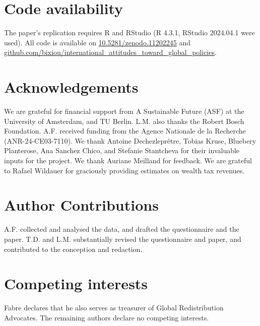 \documentclass[12pt,english]{article}
\begin{document}
\begin{small}
\section*{\normalsize Code availability}

The paper's replication requires R and RStudio (R 4.3.1, RStudio 2024.04.1 were used). All code is available on \href{https://zenodo.org/doi/10.5281/zenodo.11202245}{10.5281/zenodo.11202245} and \href{https://github.com/bixiou/international_attitudes_toward_global_policies}{github.com/bixiou/international\_attitudes\_toward\_global\_policies}. %

\section*{\normalsize Acknowledgements}

We are grateful for financial support from A Sustainable Future (ASF) at the University of Amsterdam, and TU Berlin. L.M. also thanks the Robert Bosch Foundation. A.F. received funding from the Agence Nationale de la Recherche (ANR-24-CE03-7110). %
We thank Antoine Dechezleprêtre, Tobias Kruse, Bluebery Planterose, Ana Sanchez Chico, and Stefanie Stantcheva for their invaluable inputs for the project. We thank Auriane Meilland for feedback. We are grateful to Rafael Wildauer for graciously providing estimates on wealth tax revenues. %

\section*{\normalsize Author Contributions} A.F. collected and analysed the data, and drafted the questionnaire and the paper. T.D. and L.M. substantially revised the questionnaire and paper, and contributed to the conception and redaction.

\section*{\normalsize Competing interests} Fabre declares that he also serves as treasurer of Global Redistribution Advocates. The remaining authors declare no competing interests. %
\end{small}  %

\begin{table}[h]
  \caption[List experiment: tacit support for the GCS]{Number of supported policies in the list experiment depending on the presence of the Global Climate Scheme (GCS) in the list. %
   The tacit support for the GCS is estimated by regressing the number of supported policies on the presence of the GCS in the list of policies. The social desirability is estimated as the difference-in-means between the tacit and stated support (see ), and it is not significantly different from zero even at a 20\% threshold (as shown by the 80\% Confidence Interval). 
  }\label{tab:list_exp}
  \makebox[\textwidth][c]{
  }  
\end{table}
\end{document}

